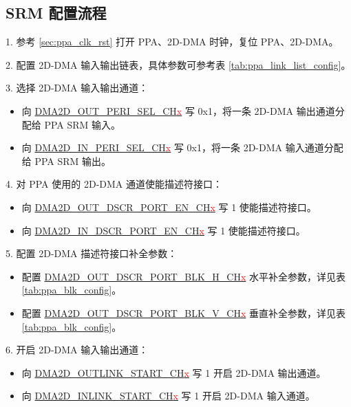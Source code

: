 \documentclass[main\_\_CN.tex]{subfiles}
\begin{document}
\subsection{SRM 配置流程}
1. 参考 \ref{sec:ppa_clk_rst} 打开 PPA、2D-DMA 时钟，复位 PPA、2D-DMA。

2. 配置 2D-DMA 输入输出链表，具体参数可参考表 \ref{tab:ppa_link_list_config}。

3. 选择 2D-DMA 输入输出通道：
\begin{itemize}
    \item 向 \hyperref[fielddesc:DMA2DOUTPERISELCHN]{DMA2D\_OUT\_PERI\_SEL\_CH\textcolor{red}{x}} 写 0x1，将一条 2D-DMA 输出通道分配给 PPA SRM 输入。
    \item 向 \hyperref[fielddesc:DMA2DINPERISELCHN]{DMA2D\_IN\_PERI\_SEL\_CH\textcolor{red}{x}} 写 0x1，将一条 2D-DMA 输入通道分配给 PPA SRM 输出。
\end{itemize}

4. 对 PPA 使用的 2D-DMA 通道使能描述符接口：
\begin{itemize}
    \item 向 \hyperref[fielddesc:DMA2DOUTDSCRPORTENCHN]{DMA2D\_OUT\_DSCR\_PORT\_EN\_CH\textcolor{red}{x}} 写 1 使能描述符接口。
    \item 向 \hyperref[fielddesc:DMA2DINDSCRPORTENCHN]{DMA2D\_IN\_DSCR\_PORT\_EN\_CH\textcolor{red}{x}} 写 1 使能描述符接口。
\end{itemize}

5. 配置 2D-DMA 描述符接口补全参数：
\begin{itemize}
    \item 配置 \hyperref[fielddesc:DMA2DOUTDSCRPORTBLKHCHN]{DMA2D\_OUT\_DSCR\_PORT\_BLK\_H\_CH\textcolor{red}{x}} 水平补全参数，详见表 \ref{tab:ppa_blk_config}。
    \item 配置 \hyperref[fielddesc:DMA2DOUTDSCRPORTBLKVCHN]{DMA2D\_OUT\_DSCR\_PORT\_BLK\_V\_CH\textcolor{red}{x}} 垂直补全参数，详见表 \ref{tab:ppa_blk_config}。
\end{itemize}

6. 开启 2D-DMA 输入输出通道：
\begin{itemize}
    \item 向 \hyperref[fielddesc:DMA2DOUTLINKSTARTCHN]{DMA2D\_OUTLINK\_START\_CH\textcolor{red}{x}} 写 1 开启 2D-DMA 输出通道。
    \item 向 \hyperref[fielddesc:DMA2DINLINKSTARTCHN]{DMA2D\_INLINK\_START\_CH\textcolor{red}{x}} 写 1 开启 2D-DMA 输入通道。
\end{itemize}
\end{document}
